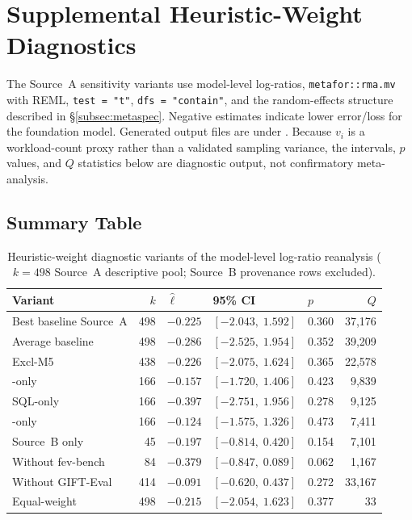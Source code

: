 \section{Supplemental Heuristic-Weight Diagnostics}\label{app:sensitivity}

The Source~A sensitivity variants use model-level log-ratios,
\texttt{metafor::rma.mv} with REML, \texttt{test = "t"},
\texttt{dfs = "contain"}, and the random-effects structure described in
\S\ref{subsec:metaspec}.  Negative estimates indicate lower error/loss for
the foundation model.  Generated output files are under
.  Because $v_i$ is a workload-count proxy rather
than a validated sampling variance, the intervals, $p$ values, and $Q$
statistics below are diagnostic output, not confirmatory meta-analysis.

\subsection{Summary Table}

\begin{table}[htbp]
\centering
\caption{Heuristic-weight diagnostic variants of the model-level log-ratio reanalysis
  ($k = 498$ Source~A descriptive pool; Source~B provenance rows excluded).}\label{tab:sensitivity-summary}
\small
\begin{tabular}{lrlllr}
\toprule
Variant & $k$ & $\hat{\ell}$ & 95\% CI & $p$ & $Q$ \\
\midrule
Best baseline Source~A & 498 & $-0.225$ & $[-2.043,\; 1.592]$ & 0.360 & 37{,}176 \\
Average baseline       & 498 & $-0.286$ & $[-2.525,\; 1.954]$ & 0.352 & 39{,}209 \\
Excl-M5                & 438 & $-0.226$ & $[-2.075,\; 1.624]$ & 0.365 & 22{,}578 \\
\WAPE{}-only           & 166 & $-0.157$ & $[-1.720,\; 1.406]$ & 0.423 & 9{,}839 \\
SQL-only               & 166 & $-0.397$ & $[-2.751,\; 1.956]$ & 0.278 & 9{,}125 \\
\MASE{}-only           & 166 & $-0.124$ & $[-1.575,\; 1.326]$ & 0.473 & 7{,}411 \\
Source~B only          &  45 & $-0.197$ & $[-0.814,\; 0.420]$ & 0.154 & 7{,}101 \\
Without fev-bench      &  84 & $-0.379$ & $[-0.847,\; 0.089]$ & 0.062 & 1{,}167 \\
Without GIFT-Eval      & 414 & $-0.091$ & $[-0.620,\; 0.437]$ & 0.272 & 33{,}167 \\
Equal-weight           & 498 & $-0.215$ & $[-2.054,\; 1.623]$ & 0.377 & 33 \\
\bottomrule
\end{tabular}
\end{table}

